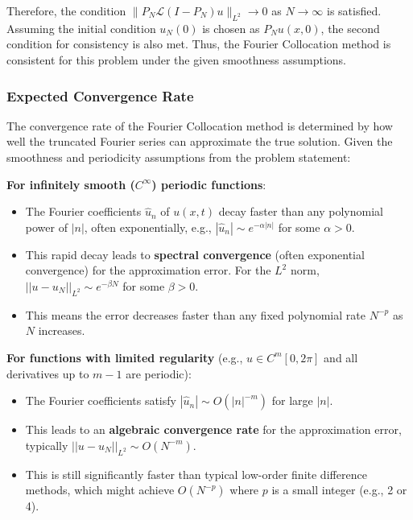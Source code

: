Therefore, the condition $\|P_N \mathcal{L}(I - P_N)u\|_{L^2} \rightarrow 0$ as $N \rightarrow \infty$ is satisfied. Assuming the initial condition $u_N(0)$ is chosen as $P_N u(x,0)$, the second condition for consistency is also met. Thus, the Fourier Collocation method is consistent for this problem under the given smoothness assumptions.

\subsubsection{Expected Convergence Rate}
The convergence rate of the Fourier Collocation method is determined by how well the truncated Fourier series can approximate the true solution. Given the smoothness and periodicity assumptions from the problem statement:

\textbf{For infinitely smooth ($C^\infty$) periodic functions}:
\begin{itemize}
    \item The Fourier coefficients $\hat{u}_n$ of $u(x,t)$ decay faster than any polynomial power of $|n|$, often exponentially, e.g., $|\hat{u}_n| \sim e^{-\alpha|n|}$ for some $\alpha > 0$.
    \item This rapid decay leads to \textbf{spectral convergence} (often exponential convergence) for the approximation error. For the $L^2$ norm, $||u - u_N||_{L^2} \sim e^{-\beta N}$ for some $\beta > 0$.
    \item This means the error decreases faster than any fixed polynomial rate $N^{-p}$ as $N$ increases.
\end{itemize}

\textbf{For functions with limited regularity} (e.g., $u \in C^m[0,2\pi]$ and all derivatives up to $m-1$ are periodic):
\begin{itemize}
    \item The Fourier coefficients satisfy $|\hat{u}_n| \sim O(|n|^{-m})$ for large $|n|$.
    \item This leads to an \textbf{algebraic convergence rate} for the approximation error, typically $||u - u_N||_{L^2} \sim O(N^{-m})$.
    \item This is still significantly faster than typical low-order finite difference methods, which might achieve $O(N^{-p})$ where $p$ is a small integer (e.g., 2 or 4).
\end{itemize}




